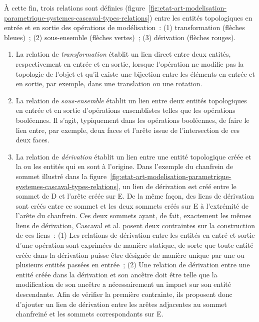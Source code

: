 À cette fin, trois relations sont définies
(figure~\ref{fig:etat-art-modelisation-parametrique-systemes-cascaval-types-relations}) entre
les entités topologiques en entrée et en sortie des opérations de modélisation~:
(1) transformation (flèches bleues)~; (2) sous-ensemble (flèches vertes)~; (3) dérivation (flèches rouges).
\begin{enumerate}
	\item La relation de \textit{transformation} établit un lien direct entre deux entités,
	      respectivement en entrée et en sortie, lorsque l'opération ne modifie
	      pas la topologie de l'objet et qu'il existe une bijection entre les
	      éléments en entrée et en sortie, par exemple, dans une translation ou
	      une rotation. %
	\item La relation de \textit{sous-ensemble} établit un lien entre deux entités topologiques en entrée et en sortie d'opérations ensemblistes telles que
	      les opérations booléennes. %
	      Il s'agit, typiquement dans les opérations booléennes, de faire le lien
	      entre, par exemple, deux faces et l'arête issue de l'intersection
	      de ces deux faces. %
	\item La relation de \textit{dérivation} établit un lien entre une entité topologique créée et la ou les entités qui en sont à l'origine. %
	      Dans l'exemple du chanfrein de sommet illustré dans la
	      figure~\ref{fig:etat-art-modelisation-parametrique-systemes-cascaval-types-relations},
	      un lien de dérivation est créé entre le sommet de D et l'arête créée sur E. %
	      De la même façon, des liens de dérivation sont créés entre ce sommet et
	      les deux sommets créés sur E à l'extrémité de l'arête du chanfrein. %
	      Ces deux sommets ayant, de fait, exactement les mêmes liens de
	      dérivation, Cascaval et al. posent deux contraintes sur la construction
	      de ces liens~: (1) Les relations de dérivation entre les
	      entités en entré et sortie d'une opération sont exprimées de manière
	      statique, de sorte que toute entité créée dans la dérivation puisse être
	      désignée de manière unique par une ou plusieurs entités passées en
	      entrée~; (2) Une relation de dérivation entre une entité créée dans la
	      dérivation et son ancêtre doit être telle que la modification de son
	      ancêtre a nécessairement un impact sur son entité descendante. %
	      Afin de vérifier la première contrainte, ils proposent donc d'ajouter un
	      lien de dérivation entre les arêtes adjacentes au sommet chanfreiné et
	      les sommets correspondants sur E. %
\end{enumerate}

